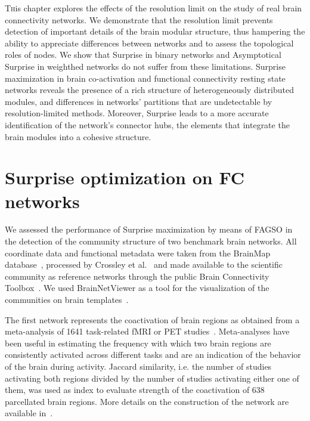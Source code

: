 \lettrine{T}{h}is chapter explores the effects of the resolution limit on the study of real brain connectivity networks.
We demonstrate that the resolution limit prevents detection of important details of the brain modular structure, thus hampering the ability to appreciate differences between networks and to assess the topological roles of nodes.
We show that Surprise in binary networks and Asymptotical Surprise in weighthed networks do not suffer from these limitations.
Surprise maximization in brain co-activation and functional connectivity resting state networks reveals the presence of a rich structure of heterogeneously distributed modules, and differences in networks' partitions that are undetectable by resolution-limited methods. Moreover, Surprise leads to a more accurate identification of the network's connector hubs, the elements that integrate the brain modules into a cohesive structure.


\section{Surprise optimization on FC networks}
We assessed the performance of Surprise maximization by means of FAGSO in the detection of the community structure of two benchmark brain networks. All coordinate data and functional metadata were taken from the BrainMap database~\cite{fox2002,laird2005}, processed by Crossley et al.~\cite{crossley2013a} and made available to the scientific community as reference networks through the public Brain Connectivity Toolbox~\cite{rubinov2010}. We used BrainNetViewer as a tool for the visualization of the communities on brain templates~\cite{xia2013}.

The first network represents the coactivation of brain regions as obtained from a meta-analysis of 1641 task-related fMRI or PET studies~\cite{crossley2013a}.
Meta-analyses have been useful in estimating the frequency with which two brain regions are consistently activated across different tasks and are an indication of the behavior of the brain during activity.
Jaccard similarity, i.e. the number of studies activating both regions divided by the number of studies activating either one of them, was used as index to evaluate strength of the coactivation of 638 parcellated brain regions. More details on the construction of the network are available in~\cite{crossley2013a}.

